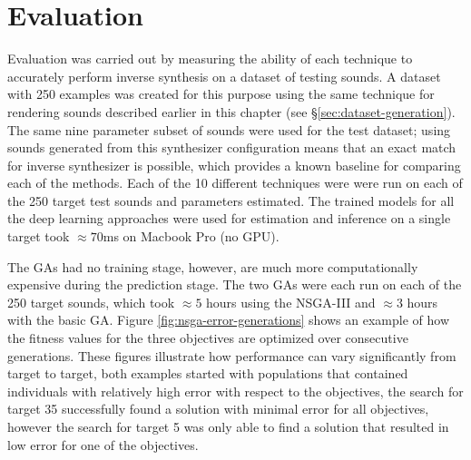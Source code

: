 


\section{Evaluation}
\label{sec:inverse-synth-eval}

Evaluation was carried out by measuring the ability of each technique to accurately perform inverse synthesis on a dataset of testing sounds. A dataset with 250 examples was created for this purpose using the same technique for rendering sounds described earlier in this chapter (see \S\ref{sec:dataset-generation}). The same nine parameter subset of sounds were used for the test dataset; using sounds generated from this synthesizer configuration means that an exact match for inverse synthesizer is possible, which provides a known baseline for comparing each of the methods. Each of the 10 different techniques were were run on each of the 250 target test sounds and parameters estimated. The trained models for all the deep learning approaches were used for estimation and inference on a single target took $\approx 70$ms on Macbook Pro (no GPU).

The GAs had no training stage, however, are much more computationally expensive during the prediction stage. The two GAs were each run on each of the 250 target sounds, which took $\approx 5$ hours using the NSGA-III and $\approx 3$ hours with the basic GA. Figure \ref{fig:nsga-error-generations} shows an example of how the fitness values for the three objectives are optimized over consecutive generations. These figures illustrate how performance can vary significantly from target to target, both examples started with populations that contained individuals with relatively high error with respect to the objectives, the search for target 35 successfully found a solution with minimal error for all objectives, however the search for target 5 was only able to find a solution that resulted in low error for one of the objectives.

